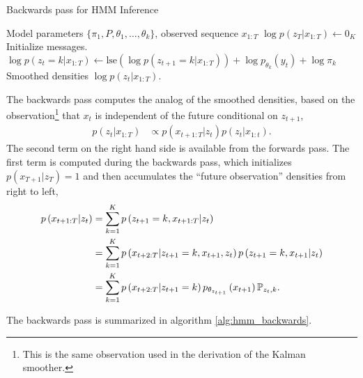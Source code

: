 \documentclass{article}
\begin{document}
\begin{algorithm}
  \begin{algorithmic}
   \caption{Backwards pass for HMM Inference}
   \label{alg:hmm_backwards}
    Model parameters $\{\pi_{1}, P, \theta_1, \dots, \theta_k\}$, observed sequence $x_{1:T}$
   \STATE $\log p\left(z_{T} \vert x_{1:T}\right) \leftarrow 0_{K}$ \hfill Initialize messages.
   \STATE $\log p\left(z_{t} = k \vert x_{1:T}\right) \leftarrow \text{lse}\left(\log p\left(z_{t + 1} = k \vert x_{1:T}\right)\right) + \log p_{\theta_{k}}\left(y_{t}\right) + \log \pi_{k}$
   \ENDFOR
   \ENDFOR
    Smoothed densities $\log p\left(z_{t} \vert x_{1:T}\right)$.
  \end{algorithmic}
\end{algorithm}

The backwards pass computes the analog of the smoothed densities, based on the
observation\footnote{This is the same observation used in the derivation of the
  Kalman smoother.} that $x_{t}$ is independent of the future conditional on
$z_{t + 1}$,
\begin{align*}
  p\left(z_{t} \vert x_{1:T}\right) &\propto p\left(x_{t + 1:T} \vert z_{t}\right) p\left(z_{t} \vert x_{1:t}\right).
\end{align*}
The second term on the right hand side is available from the forwards pass. The
first term is computed during the backwards pass, which initializes $p\left(x_{T
  + 1} \vert z_{T}\right) = 1$ and then accumulates the ``future observation''
densities from right to left,
\begin{align*}
  p\left(x_{t + 1: T} \vert z_{t}\right) &= \sum_{k = 1}^{K} p\left(z_{t + 1} = k, x_{t + 1 : T} \vert z_{t}\right) \\
  &= \sum_{k = 1}^{K} p\left(x_{t + 2: T}\vert z_{t + 1} = k, x_{t + 1}, z_{t}\right) p\left(z_{t + 1} = k, x_{t + 1} \vert z_{t}\right) \\
  &= \sum_{k = 1}^{K} p\left(x_{t + 2:T}\vert z_{t + 1} = k\right)p_{\theta_{z_{t + 1}}}\left(x_{t + 1}\right) \P_{z_{t}, k}.
\end{align*}

The backwards pass is summarized in algorithm \ref{alg:hmm_backwards}.
\end{document}

